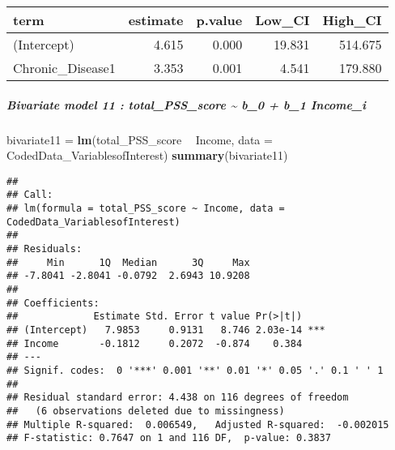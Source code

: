 \documentclass[]{article}
\newenvironment{Shaded}{\begin{snugshade}}{\end{snugshade}}
\newcommand{\DataTypeTok}[1]{\textcolor[rgb]{0.13,0.29,0.53}{#1}}
\newcommand{\DecValTok}[1]{\textcolor[rgb]{0.00,0.00,0.81}{#1}}
\newcommand{\FloatTok}[1]{\textcolor[rgb]{0.00,0.00,0.81}{#1}}
\newcommand{\KeywordTok}[1]{\textcolor[rgb]{0.13,0.29,0.53}{\textbf{#1}}}
\newcommand{\NormalTok}[1]{#1}
\newcommand{\OperatorTok}[1]{\textcolor[rgb]{0.81,0.36,0.00}{\textbf{#1}}}
\newcommand{\StringTok}[1]{\textcolor[rgb]{0.31,0.60,0.02}{#1}}
\let\oldsubparagraph\subparagraph
\renewcommand{\subparagraph}[1]{\oldsubparagraph{#1}\mbox{}}
\begin{document}
\begin{longtable}[]{@{}lrrrr@{}}
\toprule
term & estimate & p.value & Low\_CI & High\_CI\tabularnewline
\midrule
\endhead
(Intercept) & 4.615 & 0.000 & 19.831 & 514.675\tabularnewline
Chronic\_Disease1 & 3.353 & 0.001 & 4.541 & 179.880\tabularnewline
\bottomrule
\end{longtable}

\hypertarget{bivariate-model-11-total_pss_score-b_0-b_1-income_i}{%
\subparagraph{Bivariate model 11 : total\_PSS\_score \textasciitilde{}
b\_0 + b\_1
Income\_i}\label{bivariate-model-11-total_pss_score-b_0-b_1-income_i}}

\begin{Shaded}
\begin{Highlighting}[]
\NormalTok{bivariate11 =}\StringTok{ }\KeywordTok{lm}\NormalTok{(total_PSS_score }\OperatorTok{~}\StringTok{ }\NormalTok{Income, }\DataTypeTok{data =}\NormalTok{ CodedData_VariablesofInterest)}
\KeywordTok{summary}\NormalTok{(bivariate11)}
\end{Highlighting}
\end{Shaded}

\begin{verbatim}
## 
## Call:
## lm(formula = total_PSS_score ~ Income, data = CodedData_VariablesofInterest)
## 
## Residuals:
##     Min      1Q  Median      3Q     Max 
## -7.8041 -2.8041 -0.0792  2.6943 10.9208 
## 
## Coefficients:
##             Estimate Std. Error t value Pr(>|t|)    
## (Intercept)   7.9853     0.9131   8.746 2.03e-14 ***
## Income       -0.1812     0.2072  -0.874    0.384    
## ---
## Signif. codes:  0 '***' 0.001 '**' 0.01 '*' 0.05 '.' 0.1 ' ' 1
## 
## Residual standard error: 4.438 on 116 degrees of freedom
##   (6 observations deleted due to missingness)
## Multiple R-squared:  0.006549,   Adjusted R-squared:  -0.002015 
## F-statistic: 0.7647 on 1 and 116 DF,  p-value: 0.3837
\end{verbatim}

\begin{Shaded}
\end{Shaded}
\end{document}
